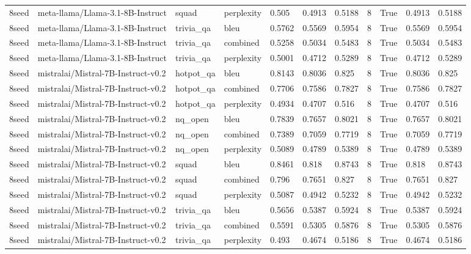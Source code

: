 \begin{tabular}{lllllllllll}
8seed & meta-llama/Llama-3.1-8B-Instruct & squad & perplexity & 0.505 & 0.4913 & 0.5188 & 8 & True & 0.4913 & 0.5188 \\
8seed & meta-llama/Llama-3.1-8B-Instruct & trivia\_qa & bleu & 0.5762 & 0.5569 & 0.5954 & 8 & True & 0.5569 & 0.5954 \\
8seed & meta-llama/Llama-3.1-8B-Instruct & trivia\_qa & combined & 0.5258 & 0.5034 & 0.5483 & 8 & True & 0.5034 & 0.5483 \\
8seed & meta-llama/Llama-3.1-8B-Instruct & trivia\_qa & perplexity & 0.5001 & 0.4712 & 0.5289 & 8 & True & 0.4712 & 0.5289 \\
8seed & mistralai/Mistral-7B-Instruct-v0.2 & hotpot\_qa & bleu & 0.8143 & 0.8036 & 0.825 & 8 & True & 0.8036 & 0.825 \\
8seed & mistralai/Mistral-7B-Instruct-v0.2 & hotpot\_qa & combined & 0.7706 & 0.7586 & 0.7827 & 8 & True & 0.7586 & 0.7827 \\
8seed & mistralai/Mistral-7B-Instruct-v0.2 & hotpot\_qa & perplexity & 0.4934 & 0.4707 & 0.516 & 8 & True & 0.4707 & 0.516 \\
8seed & mistralai/Mistral-7B-Instruct-v0.2 & nq\_open & bleu & 0.7839 & 0.7657 & 0.8021 & 8 & True & 0.7657 & 0.8021 \\
8seed & mistralai/Mistral-7B-Instruct-v0.2 & nq\_open & combined & 0.7389 & 0.7059 & 0.7719 & 8 & True & 0.7059 & 0.7719 \\
8seed & mistralai/Mistral-7B-Instruct-v0.2 & nq\_open & perplexity & 0.5089 & 0.4789 & 0.5389 & 8 & True & 0.4789 & 0.5389 \\
8seed & mistralai/Mistral-7B-Instruct-v0.2 & squad & bleu & 0.8461 & 0.818 & 0.8743 & 8 & True & 0.818 & 0.8743 \\
8seed & mistralai/Mistral-7B-Instruct-v0.2 & squad & combined & 0.796 & 0.7651 & 0.827 & 8 & True & 0.7651 & 0.827 \\
8seed & mistralai/Mistral-7B-Instruct-v0.2 & squad & perplexity & 0.5087 & 0.4942 & 0.5232 & 8 & True & 0.4942 & 0.5232 \\
8seed & mistralai/Mistral-7B-Instruct-v0.2 & trivia\_qa & bleu & 0.5656 & 0.5387 & 0.5924 & 8 & True & 0.5387 & 0.5924 \\
8seed & mistralai/Mistral-7B-Instruct-v0.2 & trivia\_qa & combined & 0.5591 & 0.5305 & 0.5876 & 8 & True & 0.5305 & 0.5876 \\
8seed & mistralai/Mistral-7B-Instruct-v0.2 & trivia\_qa & perplexity & 0.493 & 0.4674 & 0.5186 & 8 & True & 0.4674 & 0.5186 \\
\bottomrule
\end{tabular}
